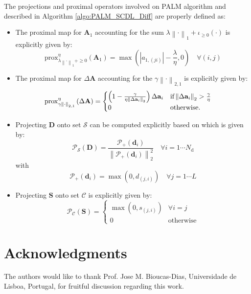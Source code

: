 \documentclass[review]{elsarticle}
\newcommand{\Ndim}{L}
\newcommand{\Natom}{N_{\mathrm{d}}}
\begin{document}
\begin{appendix}
The projections and proximal operators involved on PALM algorithm \citep{bolte_proximal_2014} and described in Algorithm \ref{algo:PALM_SCDL_Diff} are properly defined as:
\begin{itemize}
\item The proximal map for $\mathbf{A}_{1}$ accounting for the sum $\lambda\left\|\cdot\right\|_1 + \iota_{\geq0}(\cdot)$ is explicitly given by:
\begin{equation}
\mathrm{prox}^{\eta}_{\lambda\left\|\cdot\right\|_1 + \geq0}\left(\mathbf{A}_{1}\right) =   \max\left(|a_{1,{(ji)}}|-\frac{\lambda}{\eta},0\right) \quad \forall (i,j)
\end{equation}
\item The proximal map for $\Delta\mathbf{A}$ accounting for the $\gamma\left\|\cdot\right\|_{2,1}$ is explicitly given by:
\begin{equation}
\hspace{-0.5cm}\mathrm{prox}^{\eta}_{\gamma\left\|\cdot\right\|_{2,1}}\left(\Delta\mathbf{A}\right) =  \begin{cases} \left(1 - \frac{\gamma}{\eta\left\|\Delta\mathbf{a}_i\right\|_{2}}\right)\Delta\mathbf{a}_i & \text{if} \left\|\Delta\mathbf{a}_i\right\|_{2}>\frac{\gamma}{\eta}\\
				0 & \text{otherwise.}
\end{cases}
\end{equation}
\item Projecting $\mathbf{D}$ onto set $\mathcal{S}$ can be computed explicitly based on \citet{thouvenin_modeling_2017,bolte_proximal_2014} which is given by:
\begin{equation}
\mathcal{P}_{\mathcal{S}}\left(\mathbf{D}\right) = \frac{\mathcal{P}_{+}(\mathbf{d}_{i})}{\left\|\mathcal{P}_{+}(\mathbf{d}_{i})\right\|^2_2} \quad \forall i = 1 \cdots \Natom
\end{equation}
with
\begin{equation}
\mathcal{P}_{\mathcal{+}}\left(\mathbf{d}_{i}\right) = \max\left(0,d_{(j,i)}\right) \quad \forall j = 1 \cdots \Ndim
\end{equation}
\item Projecting $\mathbf{S}$ onto set $\mathcal{C}$ is explicitly given by:
\begin{equation}
\mathcal{P}_{\mathcal{C}}\left(\mathbf{S}\right) =  \begin{cases} \max\left(0,s_{(j,i)}\right) & \forall i=j \\
0 & \text{otherwise}
\end{cases}
\end{equation}
\end{itemize}
\end{appendix}
\section*{Acknowledgments}
The authors would like to thank Prof. Jose M. Bioucas-Dias, Universidade de Lisboa, Portugal, for fruitful discussion regarding this work.




\end{document}
